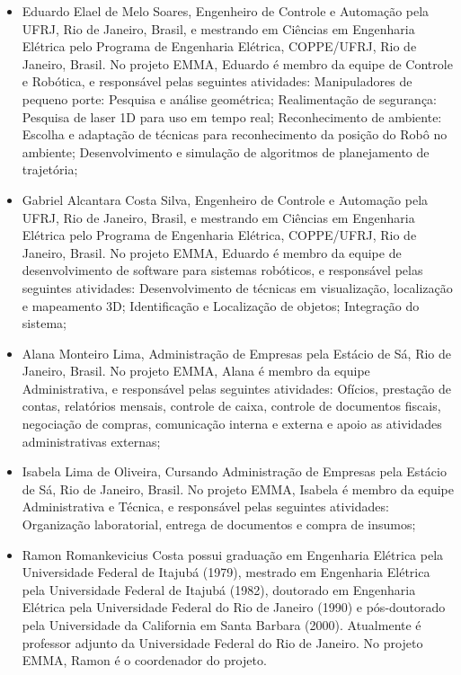 \begin{itemize}
\item Eduardo Elael de Melo Soares, Engenheiro de Controle e Automação pela UFRJ, Rio
de Janeiro, Brasil, e mestrando em Ciências em Engenharia Elétrica pelo
Programa de Engenharia Elétrica, COPPE/UFRJ, Rio de Janeiro, Brasil. No projeto
EMMA, Eduardo é membro da equipe de Controle e Robótica, e responsável pelas
seguintes atividades: Manipuladores de pequeno porte: Pesquisa e análise
geométrica; Realimentação de segurança: Pesquisa de laser 1D para uso em tempo
real; Reconhecimento de ambiente: Escolha e adaptação de técnicas para
reconhecimento da posição do Robô no ambiente; Desenvolvimento e simulação de
algoritmos de planejamento de trajetória;

\item Gabriel Alcantara Costa Silva, Engenheiro de Controle e Automação pela
UFRJ, Rio de Janeiro, Brasil, e mestrando em Ciências em Engenharia Elétrica pelo
Programa de Engenharia Elétrica, COPPE/UFRJ, Rio de Janeiro, Brasil. No projeto
EMMA, Eduardo é membro da equipe de desenvolvimento de software para sistemas
robóticos, e responsável pelas seguintes atividades: Desenvolvimento de técnicas
em visualização, localização e mapeamento 3D; Identificação e
Localização de objetos; Integração do sistema;

\item Alana Monteiro Lima, Administração de Empresas pela Estácio de Sá, Rio de
Janeiro, Brasil. No projeto EMMA, Alana é membro da equipe Administrativa, e 
responsável pelas seguintes atividades: Ofícios, prestação de contas, 
relatórios mensais, controle de caixa, controle de documentos fiscais, 
negociação de compras, comunicação interna e externa e apoio as atividades 
administrativas externas;

\item Isabela Lima de Oliveira, Cursando Administração de Empresas pela Estácio
de Sá, Rio de Janeiro, Brasil. No projeto EMMA, Isabela é membro da 
equipe Administrativa e Técnica, e responsável pelas seguintes atividades: 
Organização laboratorial, entrega de documentos e compra de insumos;

\item Ramon Romankevicius Costa possui graduação em Engenharia Elétrica pela
Universidade Federal de Itajubá (1979), mestrado em Engenharia Elétrica pela 
Universidade Federal de Itajubá (1982), doutorado em Engenharia Elétrica pela
Universidade Federal do Rio de Janeiro (1990) e pós-doutorado pela Universidade 
da California em Santa
Barbara (2000). Atualmente é professor adjunto da Universidade Federal do Rio de
Janeiro. No projeto EMMA, Ramon é o coordenador do projeto.

\end{itemize}


